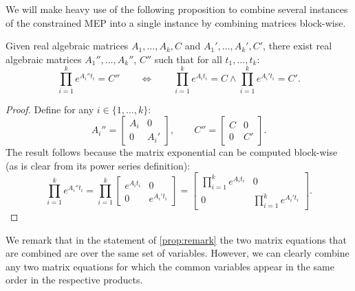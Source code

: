 

We will make heavy use of the following proposition to combine several
instances of the constrained MEP into a single instance by combining
matrices block-wise.
\begin{proposition}\label{prop:remark}
  Given real algebraic matrices $A_1,\ldots,A_k,C$ and
  $A_1',\ldots,A_k',C'$, there exist real algebraic matrices
  $A_1'',\ldots,A_k''$, $C''$ such that for all $t_1,\ldots,t_k$:
\[\prod_{i=1}^ke^{A_i''t_i}=C''\qquad\Leftrightarrow\qquad\prod_{i=1}^ke^{A_it_i}=C\wedge\prod_{i=1}^ke^{A_i't_i}=C'.\]
\label{prop:combine}
\end{proposition}

\begin{proof}
Define for any $i\in\{1,\ldots,k\}$:
\[A_i''=\begin{bmatrix}A_i&0\\0&A_i'\end{bmatrix},\qquad
C''=\begin{bmatrix}C&0\\0&C'\end{bmatrix}.\]
The result follows because the matrix exponential can be computed
block-wise (as is clear from its power series definition):
\[\prod_{i=1}^ke^{A_i''t_i}=\prod_{i=1}^k\begin{bmatrix}e^{A_it_i}&0\\0&e^{A_i't_i}\end{bmatrix}=
\begin{bmatrix}\prod_{i=1}^ke^{A_it_i}&0\\0&\prod_{i=1}^ke^{A_i't_i}\end{bmatrix}.\]
\end{proof}

We remark that in the statement of \cref{prop:remark} the
two matrix equations that are combined are over the same set of
variables.  However, we can clearly combine any two matrix equations
for which the common variables appear in the same order in the
respective products.

